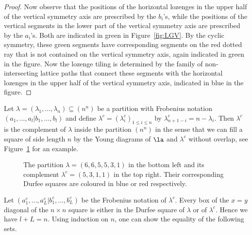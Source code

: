 \begin{proof}
\noindent
Now observe that the positions of the horizontal lozenges in the upper half of the vertical symmetry axis are prescribed by the $b_i$'s, while the positions of the vertical segments in the lower part of the vertical symmetry axis are prescribed by the $a_i$'s. Both are indicated in green in Figure~\ref{fig:LGV}. By the cyclic symmetry, these green segments have corresponding segments on the red dotted ray that is not contained on the vertical symmetry axis, again indicated in green in the figure. Now the lozenge tiling is determined by the family of non-intersecting lattice paths that connect these segments with the horizontal lozenges in the upper half of the vertical symmetry axis, indicated in blue in the figure.
\end{proof}

Let $\lambda=(\lambda_1,\ldots,\lambda_n)  \subseteq (n^n)$ be a partition with Frobenius notation $(a_1,\ldots,a_l | \allowbreak b_1,\ldots,b_l)$ and define $\lambda^c=(\lambda_i^c)_{1 \leq i \leq n}$ by $\lambda_{n+1-i}^c=n-\lambda_i$. Then $\lambda^c$ is the complement of $\lambda$ inside the partition $(n^n)$ in the sense that we can fill a square of side length $n$ by the Young diagrams of $\la$ and $\lambda^c$ without overlap, see Figure~\ref{fig: ex complement of partition} for an example.
\begin{figure}
\begin{center}
\caption{\label{fig: ex complement of partition} The partition $\lambda=(6,6,5,5,3,1)$ in the bottom left and its complement $\lambda^c = (5,3,1,1)$ in the top right. Their corresponding Durfee squares are coloured in blue or red respectively.}
\end{center}
\end{figure}
  Let $( a_1^c,\ldots,a_L^c|b_1^c,\ldots,b_L^c)$ be the Frobenius notation of $\lambda^c$. Every box of the $x=y$ diagonal of the $n \times n$ square is either in the Durfee square of $\lambda$ or of $ \lambda^c$. Hence we have $l+L=n$. Using induction on $n$, one can show the equality of the following sets.
